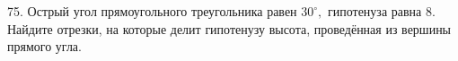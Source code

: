 75. Острый угол прямоугольного треугольника равен $30^\circ,$ гипотенуза равна 8. Найдите отрезки, на которые делит гипотенузу высота, проведённая из вершины прямого угла.\\
